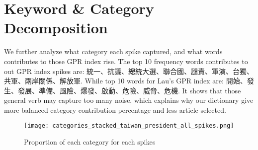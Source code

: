 
\chapter{Keyword \& Category Decomposition}

We further analyze what category each spike captured, and what words contributes to those GPR index rise. The top 10 frequency words contributes to out GPR index spikes are: 統一、抗議、總統大選、聯合國、譴責、軍演、台獨、共軍、兩岸關係、解放軍. While top 10 words for Lau's GPR index are: 開始、發生、發展、準備、風險、爆發、啟動、危險、威脅、危機. It shows that those general verb may capture too many noise, which explains why our dictionary give more balanced category contribution percentage and less article selected.

\begin{figure}[htbp]
  \centering
  \texttt{[image: categories\_stacked\_taiwan\_president\_all\_spikes.png]}
  \caption{Proportion of each category for each spikes}
  \label{fig:my_example}
\end{figure}
